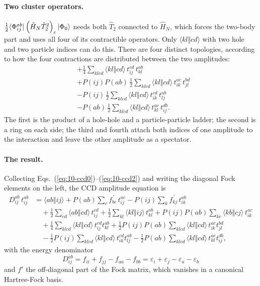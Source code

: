 \paragraph{Two cluster operators.}
$\tfrac12\langle \Phi_{ij}^{ab} | \left(\hat{H}_N\hat{T}_2^2\right)_c | \Phi_0 \rangle$ needs both $\hat{T}_2$ connected to $\hat{H}_N$, which forces the
two-body part and uses all four of its contractible operators.  Only
$\langle kl\Vert cd\rangle$ with two hole and two particle indices can do
this.  There are four distinct topologies, according to how the four
contractions are distributed between the two amplitudes:
\begin{align}
  &+\frac{1}{4}\sum_{klcd}\langle kl\Vert cd\rangle\,
     t_{ij}^{cd}\,t_{kl}^{ab}
  \nonumber\\
  &+ P(ij)P(ab)\,\frac{1}{2}\sum_{klcd}\langle kl\Vert cd\rangle\,
     t_{ik}^{ac}\,t_{jl}^{bd}
  \nonumber\\
  &- P(ij)\,\frac{1}{2}\sum_{klcd}\langle kl\Vert cd\rangle\,
     t_{ik}^{cd}\,t_{lj}^{ab}
  \nonumber\\
  &- P(ab)\,\frac{1}{2}\sum_{klcd}\langle kl\Vert cd\rangle\,
     t_{kl}^{ac}\,t_{ij}^{db}.
  \label{eq:10-ccd2}
\end{align}
The first is the product of a hole-hole and a particle-particle ladder; the
second is a ring on each side; the third and fourth attach both indices of
one amplitude to the interaction and leave the other amplitude as a spectator.

\paragraph{The result.}
Collecting Eqs.~(\ref{eq:10-ccd0})--(\ref{eq:10-ccd2}) and writing the
diagonal Fock elements on the left, the CCD amplitude equation is
\begin{align}
  D_{ij}^{ab}\,t_{ij}^{ab}
  &= \langle ab\Vert ij\rangle
   + P(ab)\sum_c f_{bc}^{\,\prime}\,t_{ij}^{ac}
   - P(ij)\sum_k f_{kj}^{\,\prime}\,t_{ik}^{ab}
  \nonumber\\
  &\quad
   + \frac{1}{2}\sum_{cd}\langle ab\Vert cd\rangle\,t_{ij}^{cd}
   + \frac{1}{2}\sum_{kl}\langle kl\Vert ij\rangle\,t_{kl}^{ab}
   + P(ij)P(ab)\sum_{kc}\langle kb\Vert cj\rangle\,t_{ik}^{ac}
  \nonumber\\
  &\quad
   + \frac{1}{4}\sum_{klcd}\langle kl\Vert cd\rangle\,t_{ij}^{cd}t_{kl}^{ab}
   + \frac{1}{2}P(ij)P(ab)\sum_{klcd}\langle kl\Vert cd\rangle\,
     t_{ik}^{ac}t_{jl}^{bd}
  \nonumber\\
  &\quad
   - \frac{1}{2}P(ij)\sum_{klcd}\langle kl\Vert cd\rangle\,
     t_{ik}^{cd}t_{lj}^{ab}
   - \frac{1}{2}P(ab)\sum_{klcd}\langle kl\Vert cd\rangle\,
     t_{kl}^{ac}t_{ij}^{db},
  \label{eq:10-ccd}
\end{align}
with the energy denominator
\begin{equation}
  D_{ij}^{ab} = f_{ii}+f_{jj}-f_{aa}-f_{bb}
   = \varepsilon_i+\varepsilon_j-\varepsilon_a-\varepsilon_b
  \label{eq:10-denominator}
\end{equation}
and $f'$ the off-diagonal part of the Fock matrix, which vanishes in a
canonical Hartree-Fock basis.

